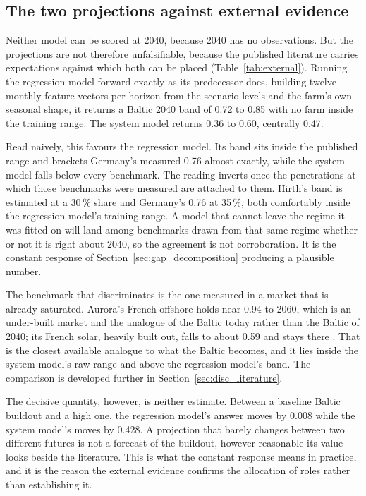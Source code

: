 \subsection{The two projections against external evidence}

Neither model can be scored at 2040, because 2040 has no observations. But the
projections are not therefore unfalsifiable, because the published literature
carries expectations against which both can be placed
(Table~\ref{tab:external}). Running the regression model forward exactly as its
predecessor does, building twelve monthly feature vectors per horizon from the
scenario levels and the farm's own seasonal shape, it returns a Baltic 2040
band of 0.72 to 0.85 with no farm inside the training range. The system model
returns 0.36 to 0.60, centrally 0.47.

Read naively, this favours the regression model. Its band sits inside the
published range and brackets Germany's measured 0.76 almost exactly, while the
system model falls below every benchmark. The reading inverts once the
penetrations at which those benchmarks were measured are attached to them.
Hirth's band is estimated at a 30\,\% share and Germany's 0.76 at 35\,\%, both
comfortably inside the regression model's training range. A model that cannot
leave the regime it was fitted on will land among benchmarks drawn from that
same regime whether or not it is right about 2040, so the agreement is not
corroboration. It is the constant response of Section~\ref{sec:gap_decomposition} producing
a plausible number.

The benchmark that discriminates is the one measured in a market that is
already saturated. Aurora's French offshore holds near 0.94 to 2060, which is
an under-built market and the analogue of the Baltic today rather than the
Baltic of 2040; its French solar, heavily built out, falls to about 0.59 and
stays there \cite{Aurora2025_France}. That is the closest available analogue to
what the Baltic becomes, and it lies inside the system model's raw range and
above the regression model's band. The comparison is developed further in
Section~\ref{sec:disc_literature}.

The decisive quantity, however, is neither estimate. Between a baseline Baltic
buildout and a high one, the regression model's answer moves by 0.008 while the
system model's moves by 0.428. A projection that barely changes between two
different futures is not a forecast of the buildout, however reasonable its
value looks beside the literature. This is what the constant response means in practice, and it is the reason
the external evidence confirms the allocation of roles rather than
establishing it.

